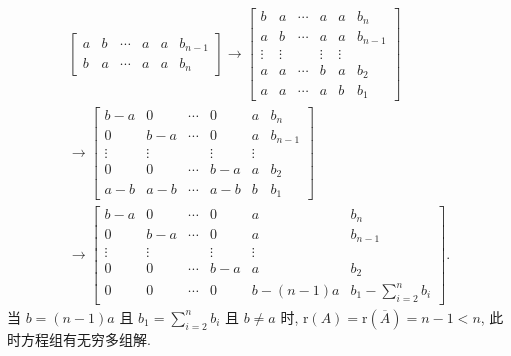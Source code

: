 \documentclass[a4paper, 11pt]{ctexart}
\newcommand{\rank}{\mathrm{r}}
\begin{document}
\begin{enumerate}
\begin{gather*}
\begin{bmatrix}
                a & b & \cdots & a & a & b_{n-1} \\
                b & a & \cdots & a & a & b_n
            \end{bmatrix}
            \rightarrow
            \begin{bmatrix}
                b & a & \cdots & a & a & b_n \\
                a & b & \cdots & a & a & b_{n-1} \\
                \vdots & \vdots &  & \vdots & \vdots \\
                a & a & \cdots & b & a & b_2 \\
                a & a & \cdots & a & b & b_1
            \end{bmatrix} \\
            \rightarrow
            \begin{bmatrix}
                b-a & 0 & \cdots & 0 & a & b_n \\
                0 & b-a & \cdots & 0 & a & b_{n-1} \\
                \vdots & \vdots &  & \vdots & \vdots \\
                0 & 0 & \cdots & b-a & a & b_2 \\
                a-b & a-b & \cdots & a-b & b & b_1
            \end{bmatrix} \\
            \rightarrow
            \begin{bmatrix}
                b-a & 0 & \cdots & 0 & a & b_n \\
                0 & b-a & \cdots & 0 & a & b_{n-1} \\
                \vdots & \vdots &  & \vdots & \vdots \\
                0 & 0 & \cdots & b-a & a & b_2 \\
                0 & 0 & \cdots & 0 & b-(n-1)a & b_1 - \sum_{i=2}^nb_i
            \end{bmatrix}.
        \end{gather*}
        当 $b = (n-1)a$ 且 $b_1 = \sum_{i=2}^nb_i$ 且 $b \ne a$ 时, $\rank(A) = \rank(\overline{A}) = n - 1 < n$, 此时方程组有无穷多组解.
        

\end{enumerate}
\end{document}
